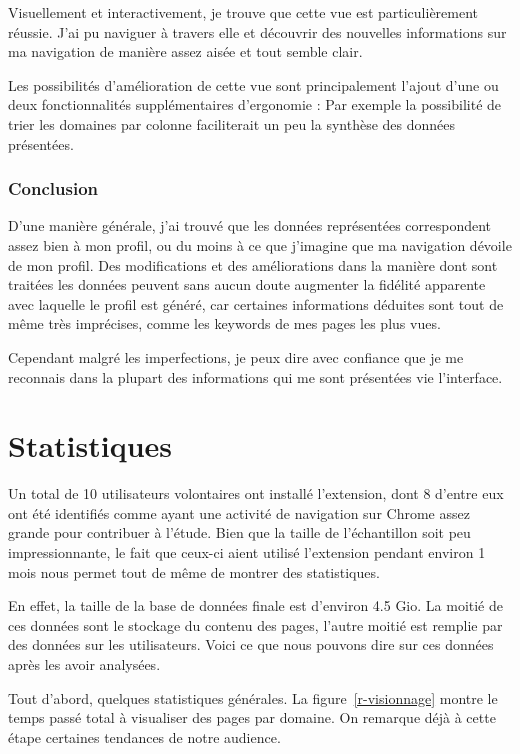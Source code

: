 		Visuellement et interactivement, je trouve que cette vue est particulièrement réussie. J'ai pu naviguer à travers elle et découvrir des nouvelles informations sur ma navigation de manière assez aisée et tout semble clair.

		Les possibilités d'amélioration de cette vue sont principalement l'ajout d'une ou deux fonctionnalités supplémentaires d'ergonomie : Par exemple la possibilité de trier les domaines par colonne faciliterait un peu la synthèse des données présentées.

		\subsubsection{Conclusion}

			D'une manière générale, j'ai trouvé que les données représentées correspondent assez bien à mon profil, ou du moins à ce que j'imagine que ma navigation dévoile de mon profil. Des modifications et des améliorations dans la manière dont sont traitées les données peuvent sans aucun doute augmenter la fidélité apparente avec laquelle le profil est généré, car certaines informations déduites sont tout de même très imprécises, comme les keywords de mes pages les plus vues.

			Cependant malgré les imperfections, je peux dire avec confiance que je me reconnais dans la plupart des informations qui me sont présentées vie l'interface.

\section{Statistiques}

	Un total de 10 utilisateurs volontaires ont installé l'extension, dont 8 d'entre eux ont été identifiés comme ayant une activité de navigation sur Chrome assez grande pour contribuer à l'étude. Bien que la taille de l'échantillon soit peu impressionnante, le fait que ceux-ci aient utilisé l'extension pendant environ 1 mois nous permet tout de même de montrer des statistiques.

	En effet, la taille de la base de données finale est d'environ 4.5 Gio. La moitié de ces données sont le stockage du contenu des pages, l'autre moitié est remplie par des données sur les utilisateurs. Voici ce que nous pouvons dire sur ces données après les avoir analysées.

	Tout d'abord, quelques statistiques générales. La figure~\ref{r-visionnage} montre le temps passé total à visualiser des pages par domaine. On remarque déjà à cette étape certaines tendances de notre audience.

